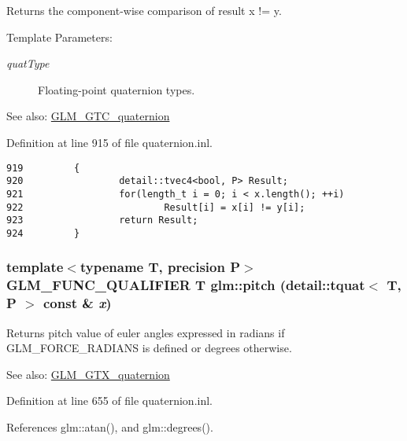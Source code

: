 Returns the component-wise comparison of result x != y.

\begin{Desc}
\item[Template Parameters:]
\begin{description}
\item[{\em quatType}]Floating-point quaternion types.\end{description}
\end{Desc}
\begin{Desc}
\item[See also:]\hyperlink{group__gtc__quaternion}{GLM\_\-GTC\_\-quaternion} \end{Desc}


Definition at line 915 of file quaternion.inl.

\begin{Code}\begin{verbatim}919         {
920                 detail::tvec4<bool, P> Result;
921                 for(length_t i = 0; i < x.length(); ++i)
922                         Result[i] = x[i] != y[i];
923                 return Result;
924         }
\end{verbatim}
\end{Code}


\hypertarget{group__gtc__quaternion_g091250a9d0674463c4c9342563184bcd}{
\subsubsection[pitch]{\setlength{\rightskip}{0pt plus 5cm}template$<$typename T, precision P$>$ GLM\_\-FUNC\_\-QUALIFIER T glm::pitch (detail::tquat$<$ T, P $>$ const \& {\em x})}}
\label{group__gtc__quaternion_g091250a9d0674463c4c9342563184bcd}


Returns pitch value of euler angles expressed in radians if GLM\_\-FORCE\_\-RADIANS is defined or degrees otherwise.

\begin{Desc}
\item[See also:]\hyperlink{group__gtx__quaternion}{GLM\_\-GTX\_\-quaternion} \end{Desc}


Definition at line 655 of file quaternion.inl.

References glm::atan(), and glm::degrees().

